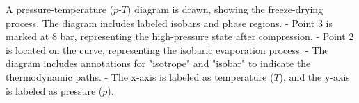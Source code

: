 A pressure-temperature (\( p \)-\( T \)) diagram is drawn, showing the freeze-drying process. The diagram includes labeled isobars and phase regions.  
- Point 3 is marked at 8 bar, representing the high-pressure state after compression.  
- Point 2 is located on the curve, representing the isobaric evaporation process.  
- The diagram includes annotations for "isotrope" and "isobar" to indicate the thermodynamic paths.  
- The x-axis is labeled as temperature (\( T \)), and the y-axis is labeled as pressure (\( p \)).
